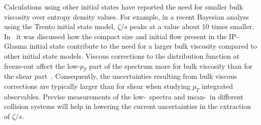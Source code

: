 Calculations using other initial states have reported the need for smaller bulk 
  viscosity over entropy density values. 
For example, in a recent Bayesian analyss using the Trento initial state model, 
  $\zeta/s$ peaks at a value about 10 times smaller. 
In~\cite{Schenke:2018fci} it was discussed how the compact size and initial 
  flow present in the IP-Glasma initial state contribute to the need for a 
  larger bulk viscosity compared to other initial state models. 
Viscous corrections to the distribution function at freeze-out affect the 
  low-$p_T$ part of the spectrum more for bulk viscosity than for the shear 
  part~\cite{Bozek:2009dw,Paquet:2015lta}. 
Consequently, the uncertainties resulting from bulk viscous corrections are 
  typically larger than for shear when studying $p_T$ integrated observables. 
Previse measurements of the low-\pt\ spectra and mean-\pt\ in different 
  collision systems  will help in lowering the current uncertainties
	in the extraction of $\zeta/s$.


